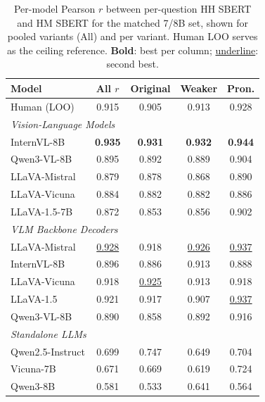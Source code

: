 \begin{table}[ht]
\centering
\small
\setlength{\tabcolsep}{3pt}

\caption{Per-model Pearson $r$ between per-question HH SBERT and HM SBERT for the matched 7/8B set, shown for pooled variants (All) and per variant. Human LOO serves as the ceiling reference. \textbf{Bold}: best per column; \underline{underline}: second best.}
\label{tab:hh_hm_scatter_corr_compact}
\begin{tabular}{lcccc}
\toprule
Model & All $r$ & Original & Weaker & Pron. \\
\midrule
Human (LOO) & 0.915 & 0.905 & 0.913 & 0.928 \\
\midrule
\multicolumn{5}{l}{\textit{Vision-Language Models}} \\
\midrule
InternVL-8B   & \textbf{0.935} & \textbf{0.931} & \textbf{0.932} & \textbf{0.944} \\
Qwen3-VL-8B   & 0.895 & 0.892 & 0.889 & 0.904 \\
LLaVA-Mistral & 0.879 & 0.878 & 0.868 & 0.890 \\
LLaVA-Vicuna  & 0.884 & 0.882 & 0.882 & 0.886 \\
LLaVA-1.5-7B  & 0.872 & 0.853 & 0.856 & 0.902 \\
\midrule
\multicolumn{5}{l}{\textit{VLM Backbone Decoders}} \\
\midrule
LLaVA-Mistral & \underline{0.928} & 0.918 & \underline{0.926} & \underline{0.937} \\
InternVL-8B   & 0.896 & 0.886 & 0.913 & 0.888 \\
LLaVA-Vicuna  & 0.918 & \underline{0.925} & 0.913 & 0.918 \\
LLaVA-1.5     & 0.921 & 0.917 & 0.907 & \underline{0.937} \\
Qwen3-VL-8B   & 0.890 & 0.858 & 0.892 & 0.916 \\
\midrule
\multicolumn{5}{l}{\textit{Standalone LLMs}} \\
\midrule
Qwen2.5-Instruct & 0.699 & 0.747 & 0.649 & 0.704 \\
Vicuna-7B           & 0.671 & 0.669 & 0.619 & 0.724 \\
Qwen3-8B            & 0.581 & 0.533 & 0.641 & 0.564 \\
\bottomrule
\end{tabular}
\end{table}
